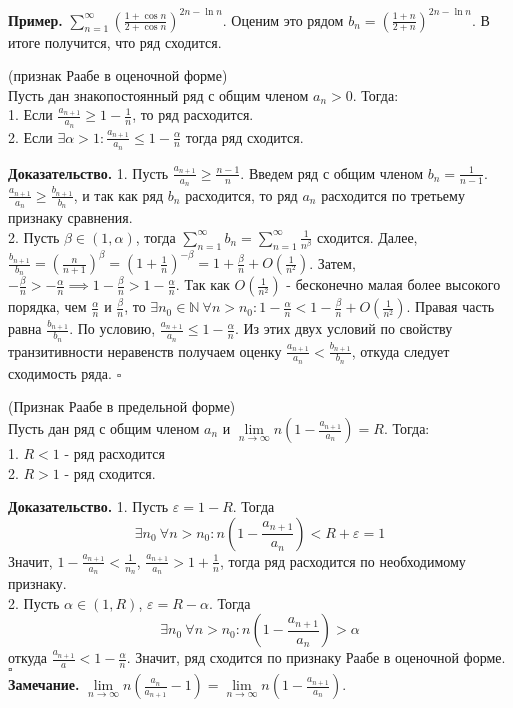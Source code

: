 \textbf{Пример.} $\sum\limits_{n=1}^{\infty}\left(\frac{1+\cos{n}}{2+\cos{n}}
\right)^{2n-\ln{n}}$. Оценим это рядом $b_n=\left(\frac{1+n}{2+n}\right)^{2n
-\ln{n}}$. В итоге получится, что ряд сходится.
\begin{theor}
    (признак Раабе в оценочной форме)\\
    Пусть дан знакопостоянный ряд с общим членом $a_n>0$. Тогда:\\
    1. Если $\frac{a_{n+1}}{a_n}\geqslant1-\frac{1}{n}$, то ряд расходится.\\
2. Если $\exists \alpha>1: \frac{a_{n+1}}{a_n}\leqslant 1-\frac{\alpha}{n}$
тогда ряд сходится. 
\end{theor}
\textbf{Доказательство.}  
1. Пусть $\frac{a_{n+1}}{a_n}\geqslant \frac{n-1}{n}$.
Введем ряд с общим членом $b_n=\frac{1}{n-1}$. 
$\frac{a_{n+1}}{a_n}\geqslant\frac{b_{n+1}}{b_n}$, 
и так как ряд $b_n$ расходится, то ряд $a_n$ расходится по третьему 
признаку сравнения.\\
2. Пусть  $\beta\in(1,\alpha)$, тогда $\sum\limits_{n=1}^{\infty} b_n=
\sum\limits_{n=1}^{\infty} \frac{1}{n^\beta}$ сходится. Далее,
$\frac{b_{n+1}}{b_n}=(\frac{n}{n+1})^\beta=(1+\frac{1}{n})^{-\beta}=
1+\frac{\beta}{n}+O(\frac{1}{n^2})$. Затем, $- \frac{\beta}{n}>- 
\frac{\alpha}{n}\implies 1-\frac{\beta}{n}>1-\frac{\alpha}{n}$.
Так как $O(\frac{1}{n^2})$ - бесконечно малая более высокого порядка, чем 
$\frac{\alpha}{n}$ и $\frac{\beta}{n}$, то $\exists n_0\in\mathbb{N}~\forall
n>n_0:1-\frac{\alpha}{n}<1-\frac{\beta}{n}+O(\frac{1}{n^2})$. Правая часть
равна $\frac{b_{n+1}}{b_n}$. По условию, $\frac{a_{n+1}}{a_n}\leqslant 
1-\frac{\alpha}{n}$. Из этих двух условий по свойству транзитивности 
неравенств получаем оценку $\frac{a_{n+1}}{a_n}<\frac{b_{n+1}}{b_n}$, откуда 
следует сходимость ряда. $\square$ 
\begin{theor}
    (Признак Раабе в предельной форме)\\
    Пусть дан ряд с общим членом $a_n$ и
    $\lim\limits_{n \to \infty}n(1-\frac{a_{n+1}}{a_n})=R$. 
    Тогда:\\
    1. $R<1$ - ряд расходится\\
    2. $R>1$ - ряд сходится. 
\end{theor}
\textbf{Доказательство.} 
1. Пусть $\varepsilon=1-R$. Тогда
$$\exists n_0~\forall n>n_0:
n\left(1-\frac{a_{n+1}}{a_n}\right)<R+\varepsilon=1$$
Значит, $1-\frac{a_{n+1}}{a_n}<\frac{1}{n_n}$,
$\frac{a_{n+1}}{a_n}>1+\frac{1}{n}$,
тогда ряд расходится по необходимому признаку.\\
2. Пусть $\alpha\in(1,R)$, $\varepsilon=R-\alpha$. Тогда 
$$\exists n_0~\forall n>n_0:n\left(1-\frac{a_{n+1}}{a_n}\right)>\alpha$$ 
откуда $\frac{a_{n+1}}{a}<1-\frac{\alpha}{n}$. Значит, ряд сходится по
признаку Раабе в оценочной форме. $\square$\\
\textbf{Замечание.} 
$\lim\limits_{n \to \infty}n(\frac{a_n}{a_{n+1}}-1)=
\lim\limits_{n \to \infty}n(1-\frac{a_{n+1}}{a_n})$.


